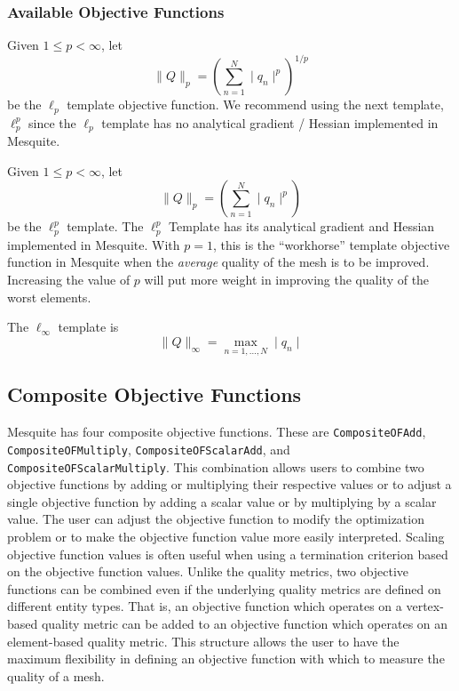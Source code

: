 \subsubsection{Available Objective Functions}

 \newline
Given $1 \leq p < \infty$, let
\begin{equation}
\| Q \|_p = ( \sum_{n=1}^N \mid q_n \mid^p )^{1/p}
\end{equation}
be the $\ell_p$ template objective function. We recommend using the next template, \
$\ell_p^p$ since the $\ell_p$ template has no analytical gradient / Hessian implemented in Mesquite.\newline

 \newline
Given $1 \leq p < \infty$, let 
\begin{equation}
\| Q \|_p = ( \sum_{n=1}^N \mid q_n \mid^p )
\end{equation}
be the 
$\ell_p^p$ template. The $\ell_p^p$ Template has its analytical gradient and Hessian implemented in
Mesquite. With $p=1$, this is the ``workhorse'' template objective function in Mesquite when the \emph{average}
quality of the mesh is to be improved. Increasing the value of $p$ will put more weight in improving
the quality of the worst elements. 
\newline

 \newline
The $\ell_{\infty}$ template is
\begin{equation}
\| Q \|_{\infty} = \max_{n=1,\ldots,N} \mid q_n \mid
\end{equation}


\subsection{Composite Objective Functions}

Mesquite has four composite objective functions.  These are
\texttt{CompositeOFAdd}, \texttt{CompositeOFMultiply}, \texttt{CompositeOFScalarAdd}, and
\texttt{CompositeOFScalarMultiply}.  This combination allows users
to combine two objective functions by adding or multiplying
their respective values or to adjust a single objective function
by adding a scalar value or by multiplying by a scalar value.  
The user can adjust the objective function to modify the
optimization problem or to make the objective function value
more easily interpreted.  Scaling objective function values
is often useful when using a termination criterion based on the
objective function values. Unlike the quality metrics, 
two objective functions can be combined
even if the underlying quality metrics are defined on different entity
types.  That is, an objective function which operates on a vertex-based
quality metric can be added to an objective function which operates
on an element-based quality metric.  This structure allows the user
to have the maximum flexibility in defining an objective function with
which to measure the quality of a mesh.


